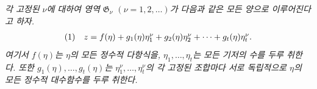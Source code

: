 
\emph{각 고정된 $\nu$에 대하여 영역 $\mathfrak G_\nu$ $(\nu=1,2,\ldots)$가 다음과 같은 모든 양으로 이루어진다고 하자.}
\[
\begin{array}{@{}l@{\quad}c@{}}
(1)& z=f(\eta)+g_1(\eta)\eta_1^\nu+g_2(\eta)\eta_2^\nu+\cdots+g_t(\eta)\eta_t^\nu.
\end{array}
\]
\emph{여기서 $f(\eta)$는 $\eta$의 모든 정수적 다항식을, $\eta_1,\ldots,\eta_t$는 모든 기저의 수를 두루 취한다. 또한 $g_1(\eta),\ldots,g_t(\eta)$는 $\eta_1^\nu,\ldots,\eta_t^\nu$의 각 고정된 조합마다 서로 독립적으로 $\eta$의 모든 정수적 대수함수를 두루 취한다.}

